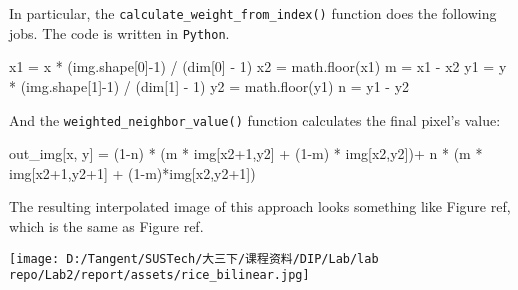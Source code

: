 \documentclass[
]{article}
\newenvironment{Shaded}{}{}
\newcommand{\DecValTok}[1]{\textcolor[rgb]{0.25,0.63,0.44}{#1}}
\newcommand{\NormalTok}[1]{#1}
\newcommand{\OperatorTok}[1]{\textcolor[rgb]{0.40,0.40,0.40}{#1}}
\begin{document}
In particular, the \texttt{calculate\_weight\_from\_index()} function
does the following jobs. The code is written in \texttt{Python}.

\begin{Shaded}
\begin{Highlighting}[]
\NormalTok{x1 }\OperatorTok{=}\NormalTok{ x }\OperatorTok{*}\NormalTok{ (img.shape[}\DecValTok{0}\NormalTok{]}\OperatorTok{{-}}\DecValTok{1}\NormalTok{) }\OperatorTok{/}\NormalTok{ (dim[}\DecValTok{0}\NormalTok{] }\OperatorTok{{-}} \DecValTok{1}\NormalTok{)}
\NormalTok{x2 }\OperatorTok{=}\NormalTok{ math.floor(x1)}
\NormalTok{m }\OperatorTok{=}\NormalTok{ x1 }\OperatorTok{{-}}\NormalTok{ x2}
\NormalTok{y1 }\OperatorTok{=}\NormalTok{ y }\OperatorTok{*}\NormalTok{ (img.shape[}\DecValTok{1}\NormalTok{]}\OperatorTok{{-}}\DecValTok{1}\NormalTok{) }\OperatorTok{/}\NormalTok{ (dim[}\DecValTok{1}\NormalTok{] }\OperatorTok{{-}} \DecValTok{1}\NormalTok{)}
\NormalTok{y2 }\OperatorTok{=}\NormalTok{ math.floor(y1)}
\NormalTok{n }\OperatorTok{=}\NormalTok{ y1 }\OperatorTok{{-}}\NormalTok{ y2}
\end{Highlighting}
\end{Shaded}

And the \texttt{weighted\_neighbor\_value()} function calculates the
final pixel's value:

\begin{Shaded}
\begin{Highlighting}[]
\NormalTok{out\_img[x, y] }\OperatorTok{=}\NormalTok{ (}\DecValTok{1}\OperatorTok{{-}}\NormalTok{n) }\OperatorTok{*}\NormalTok{ (m }\OperatorTok{*}\NormalTok{ img[x2}\OperatorTok{+}\DecValTok{1}\NormalTok{,y2] }\OperatorTok{+}\NormalTok{ (}\DecValTok{1}\OperatorTok{{-}}\NormalTok{m) }\OperatorTok{*}\NormalTok{ img[x2,y2])}\OperatorTok{+}\NormalTok{ n }\OperatorTok{*}\NormalTok{ (m }\OperatorTok{*}\NormalTok{ img[x2}\OperatorTok{+}\DecValTok{1}\NormalTok{,y2}\OperatorTok{+}\DecValTok{1}\NormalTok{] }\OperatorTok{+}\NormalTok{ (}\DecValTok{1}\OperatorTok{{-}}\NormalTok{m)}\OperatorTok{*}\NormalTok{img[x2,y2}\OperatorTok{+}\DecValTok{1}\NormalTok{])}
\end{Highlighting}
\end{Shaded}

The resulting interpolated image of this approach looks something like
Figure ref, which is the same as Figure ref.

\texttt{[image: D:/Tangent/SUSTech/大三下/课程资料/DIP/Lab/lab repo/Lab2/report/assets/rice\_bilinear.jpg]}
\end{document}
